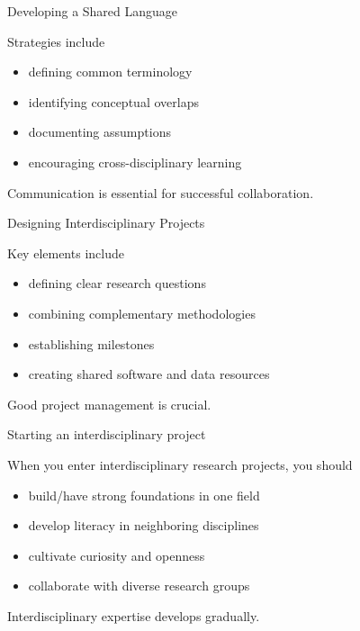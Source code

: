 \documentclass{beamer}
\begin{document}

\begin{frame}{Developing a Shared Language}

Strategies include

\begin{itemize}
\item defining common terminology
\item identifying conceptual overlaps
\item documenting assumptions
\item encouraging cross-disciplinary learning
\end{itemize}

Communication is essential for successful collaboration.

\end{frame}


\begin{frame}{Designing Interdisciplinary Projects}

Key elements include

\begin{itemize}
\item defining clear research questions
\item combining complementary methodologies
\item establishing milestones
\item creating shared software and data resources
\end{itemize}

Good project management is crucial.

\end{frame}


\begin{frame}{Starting an interdisciplinary project}

When you  enter interdisciplinary research projects, you should

\begin{itemize}
\item build/have strong foundations in one field
\item develop literacy in neighboring disciplines
\item cultivate curiosity and openness
\item collaborate with diverse research groups
\end{itemize}

Interdisciplinary expertise develops gradually.

\end{frame}
\end{document}
